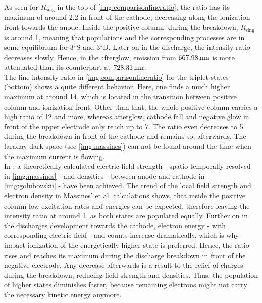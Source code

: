 \documentclass[a4paper,10pt,twoside]{article}
\newcommand{\ix}[1]{_\text{#1}}
\begin{document}
		As seen for $R\ix{sing}$ in the top of \autoref{img:comparisonlineratio}, the ratio has its maximum of around 2.2 in front of the cathode, decreasing along the ionization front towards the anode. Inside the positive column, during the breakdown, $R\ix{sing}$ is around 1, meaning that populations and the corresponding processes are in some equilibrium for $3^1$S and $3^1$D. Later on in the discharge, the intensity ratio decreases slowly. Hence, in the afterglow, emission from $\unit[667.98]{nm}$ is more attenuated than its counterpart at $\unit[728.31]{nm}$.\\
		The line intensity ratio in \autoref{img:comparisonlineratio} for the triplet states (bottom) shows a quite different behavior. Here, one finds a much higher maximum at around 14, which is located in the transition between positive column and ionization front. Other than that, the whole positive column carries a high ratio of 12 and more, whereas afterglow, cathode fall and negative glow in front of the upper electrode only reach up to 7. The ratio even decreases to 5 during the breakdown in front of the cathode and remains so, afterwards. The faraday dark space (see \autoref{img:massines}) can not be found around the time when the maximum current is flowing.\\		
		In \cite{Massines}, \cite{0022-3727-36-1-306} a theoretically calculated electric field \newline 	strength - spatio-temporally resolved in \autoref{img:massines} - and densities - between anode and cathode in \autoref{img:golubovskii} - have been achieved. The trend of the local field strength and electron density in Massines' et al. calculations shows, that inside the positive column low excitation rates and energies can be expected, therefore leaving the intensity ratio at around 1, as both states are populated equally. Further on in the discharges development towards the cathode, electron energy - with corresponding electric field - and counts increase dramatically, which is why impact ionization of the energetically higher state is preferred. Hence, the ratio rises and reaches its maximum during the discharge breakdown in front of the negative electrode. Any decrease afterwards is a result to the relief of charges during the breakdown, reducing field strength and densities. Thus, the population of higher states diminishes faster, because remaining electrons might not carry the necessary kinetic energy anymore.
		
\end{document}
